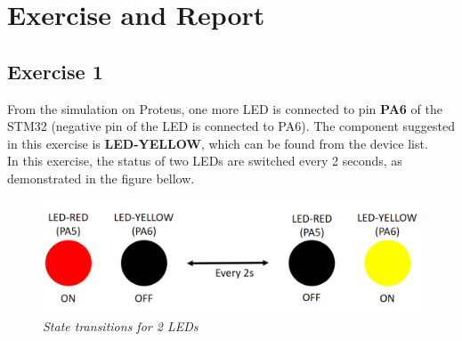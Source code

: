 
\newpage
\section{Exercise and Report}
\subsection{Exercise 1}
From the simulation on Proteus, one more LED is connected to pin \textbf{PA6} of the STM32 (negative pin of the LED is connected to PA6). The component suggested in this exercise is \textbf{LED-YELLOW}, which can be found from the device list.\\



In this exercise, the status of two LEDs are switched every 2 seconds, as demonstrated in the figure bellow.

\begin{figure}[H
]
    \centering
    \includegraphics[width=5in]{source/picture/bai_1/pic1.PNG}
    \caption{\textit{State transitions for 2 LEDs}}
    \label{bai1_pic1}
\end{figure}

